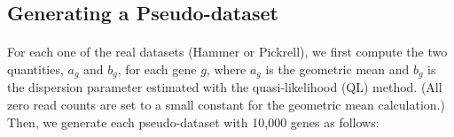 \documentclass[10pt]{article}
\begin{document}
\subsection*{Generating a Pseudo-dataset}

\paragraph{} \indent For each one of the real datasets (Hammer or Pickrell), we first compute the two quantities, $a_g$ and $b_g$, for each gene $g$, where $a_g$ is the geometric mean and $b_g$ is the dispersion parameter estimated with the quasi-likelihood (QL) method. (All zero read counts are set to a small constant for the geometric mean calculation.) Then, we generate each pseudo-dataset with 10,000 %
genes as follows:
\end{document}
